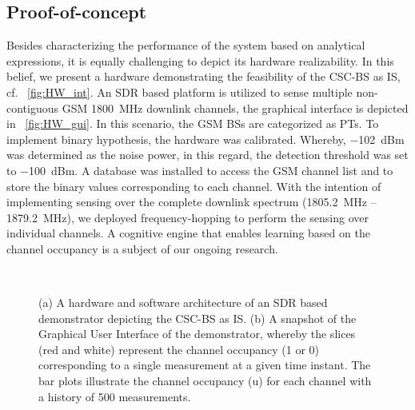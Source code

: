 \documentclass[draftcls, onecolumn, 11pt]{IEEEtran}
\begin{document}
\subsection*{Proof-of-concept}
Besides characterizing the performance of the system based on analytical expressions, it is equally challenging to depict its hardware realizability. In this belief, we present a hardware demonstrating the feasibility of the CSC-BS as IS, cf. \figurename~\ref{fig:HW_int}. An SDR based platform is utilized to sense multiple non-contiguous GSM \SI{1800}{MHz} downlink channels, the graphical interface is depicted in \figurename~\ref{fig:HW_gui}. In this scenario, the GSM BSs are categorized as PTs. To implement binary hypothesis, the hardware was calibrated. Whereby, \SI{-102}{dBm} was determined as the noise power, in this regard, the detection threshold was set to \SI{-100}{dBm}. A database was installed to access the GSM channel list and to store the binary values corresponding to each channel. With the intention of implementing sensing over the complete downlink spectrum (\SI{1805.2}{MHz} -- \SI{1879.2}{MHz}), we deployed frequency-hopping to perform the sensing over individual channels. A cognitive engine that enables learning based on the channel occupancy is a subject of our ongoing research.  

\begin{figure}[!t]
\centering
{} \\
\vfil
{} 
\caption{(a) A hardware and software architecture of an SDR based demonstrator
depicting the CSC-BS as IS. (b) A snapshot of the Graphical User Interface of the demonstrator, whereby the slices (red and white) represent the channel occupancy (1 or 0) corresponding to a single measurement at a given time instant. The bar plots illustrate the channel occupancy (u) for each channel with a history of 500 measurements.}
\label{fig:HW_I}
\end{figure}
\end{document}
